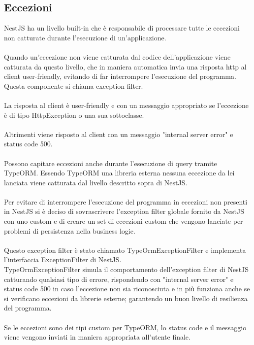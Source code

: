 \subsection{Eccezioni}
NestJS ha un livello built-in che è responsabile di processare tutte le eccezioni non catturate durante 
l'esecuzione di un'applicazione.
\\\\
Quando un'eccezione non viene catturata dal codice dell'applicazione viene catturata da questo livello,
che in maniera automatica invia una risposta http al client user-friendly, evitando di far interrompere 
l'esecuzione del programma. Questa componente si chiama exception filter.
\\\\
La risposta al client è user-friendly e con un messaggio appropriato se l'eccezione è di tipo HttpException o 
una sua sottoclasse. 
\\\\
Altrimenti viene risposto al client con un messaggio "internal server error" e status code 500.
\\\\
Possono capitare eccezioni anche durante l'esecuzione di query tramite TypeORM. Essendo TypeORM una libreria
esterna nessuna eccezione da lei lanciata viene catturata dal livello descritto sopra di NestJS.
\\\\
Per evitare di interrompere l'esecuzione del programma in eccezioni non presenti in NestJS si è deciso di 
sovrascrivere l'exception filter globale fornito da NestJS con uno custom e di creare un set di eccezioni
custom che vengono lanciate per problemi di persistenza nella business logic.
\\\\
Questo exception filter è stato chiamato TypeOrmExceptionFilter e implementa l'interfaccia ExceptionFilter di
NestJS. 
\\
TypeOrmExceptionFilter simula il comportamento dell'exception filter di NestJS catturando qualsiasi
tipo di errore, rispondendo con "internal server error" e status code 500 in caso l'eccezione non sia riconosciuta
e in più funziona anche se si verificano eccezioni da librerie esterne; garantendo un buon livello di resilienza
del programma. 
\\\\
Se le eccezioni sono dei tipi custom per TypeORM, lo status code e il messaggio viene vengono inviati in maniera
appropriata all'utente finale.
\\\\
